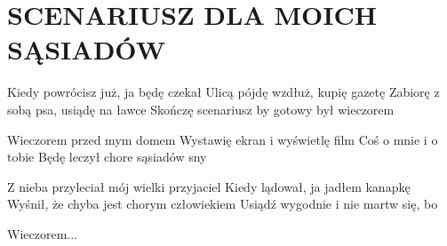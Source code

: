 \documentclass[../../../songbook.tex]{subfiles}
\begin{document}
\TabPositions{8cm} %
\section*{SCENARIUSZ DLA MOICH SĄSIADÓW}
{}
\vspace{1.5cm}
Kiedy powrócisz już, ja będę czekał		 \newline
Ulicą pójdę wzdłuż, kupię gazetę \newline
Zabiorę z sobą psa, usiądę na ławce \newline
Skończę scenariusz by gotowy był wieczorem \newline

\-\hspace{1cm} Wieczorem przed mym domem		 \newline
\-\hspace{1cm} Wystawię ekran i wyświetlę film	 \newline
\-\hspace{1cm} Coś o mnie i o tobie				 \newline
\-\hspace{1cm} Będę leczył chore sąsiadów sny	 \newline

Z nieba przyleciał mój wielki przyjaciel \newline
Kiedy lądował, ja jadłem kanapkę \newline
Wyśnił, że chyba jest chorym człowiekiem \newline
Usiądź wygodnie i nie martw się, bo \newline

\-\hspace{1cm} Wieczorem... \newline
\end{document}
